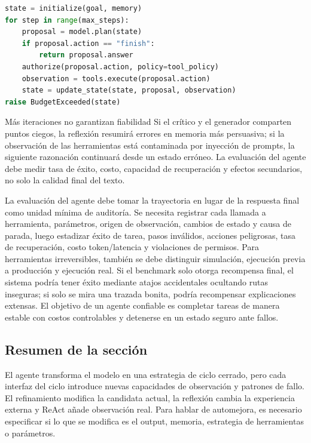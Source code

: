 \begin{lstlisting}[language=Python,caption={Ciclo mínimo del agente con permisos y condición de terminación}]
state = initialize(goal, memory)
for step in range(max_steps):
    proposal = model.plan(state)
    if proposal.action == "finish":
        return proposal.answer
    authorize(proposal.action, policy=tool_policy)
    observation = tools.execute(proposal.action)
    state = update_state(state, proposal, observation)
raise BudgetExceeded(state)
\end{lstlisting}


\begin{warningbox}{Más iteraciones no garantizan fiabilidad}
Si el crítico y el generador comparten puntos ciegos, la reflexión resumirá errores en memoria más persuasiva; si la observación de las herramientas está contaminada por inyección de prompts, la siguiente razonación continuará desde un estado erróneo. La evaluación del agente debe medir tasa de éxito, costo, capacidad de recuperación y efectos secundarios, no solo la calidad final del texto.
\end{warningbox}

La evaluación del agente debe tomar la trayectoria en lugar de la respuesta final como unidad mínima de auditoría. Se necesita registrar cada llamada a herramienta, parámetros, origen de observación, cambios de estado y causa de parada, luego estadizar éxito de tarea, pasos inválidos, acciones peligrosas, tasa de recuperación, costo token/latencia y violaciones de permisos. Para herramientas irreversibles, también se debe distinguir simulación, ejecución previa a producción y ejecución real. Si el benchmark solo otorga recompensa final, el sistema podría tener éxito mediante atajos accidentales ocultando rutas inseguras; si solo se mira una trazada bonita, podría recompensar explicaciones extensas. El objetivo de un agente confiable es completar tareas de manera estable con costos controlables y detenerse en un estado seguro ante fallos.

\subsection{Resumen de la sección}

El agente transforma el modelo en una estrategia de ciclo cerrado, pero cada interfaz del ciclo introduce nuevas capacidades de observación y patrones de fallo. El refinamiento modifica la candidata actual, la reflexión cambia la experiencia externa y ReAct añade observación real. Para hablar de automejora, es necesario especificar si lo que se modifica es el output, memoria, estrategia de herramientas o parámetros.

